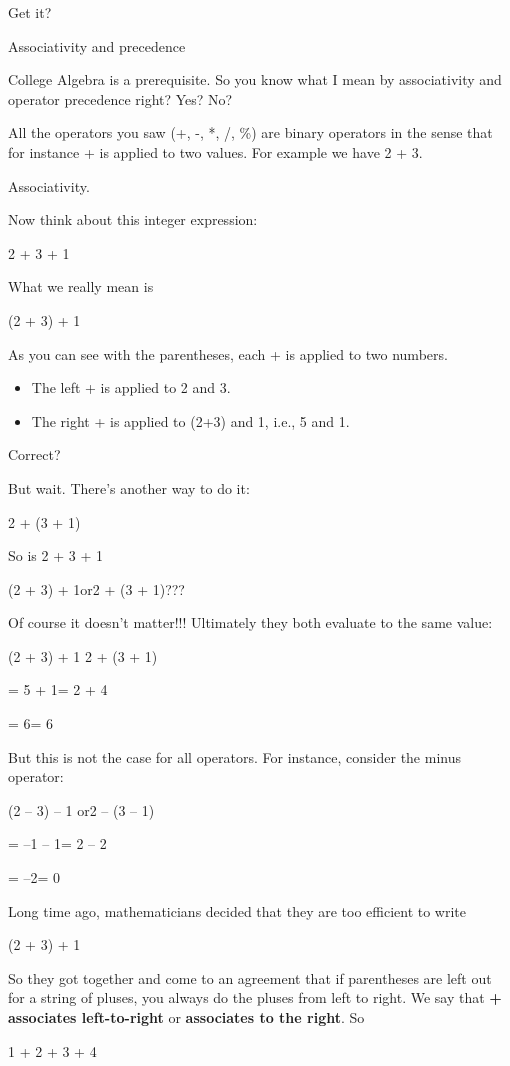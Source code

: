 \documentclass[
]{article}
\providecommand{\tightlist}{%
  \setlength{\itemsep}{0pt}\setlength{\parskip}{0pt}}
\begin{document}
Get it?

Associativity and precedence

College Algebra is a prerequisite. So you know what I mean by
associativity and operator precedence right? Yes? No?

All the operators you saw (+, -, *, /, \%) are binary operators in the
sense that for instance + is applied to two values. For example we have
2 + 3.

Associativity.

Now think about this integer expression:

2 + 3 + 1

What we really mean is

(2 + 3) + 1

As you can see with the parentheses, each + is applied to two numbers.

\begin{itemize}
\tightlist
\item
  The left + is applied to 2 and 3.
\item
  The right + is applied to (2+3) and 1, i.e., 5 and 1.
\end{itemize}

Correct?

But wait. There's another way to do it:

2 + (3 + 1)

So is 2 + 3 + 1

(2 + 3) + 1or2 + (3 + 1)???

Of course it doesn't matter!!! Ultimately they both evaluate to the same
value:

(2 + 3) + 1 2 + (3 + 1)

= 5 + 1= 2 + 4

= 6= 6

But this is not the case for all operators. For instance, consider the
minus operator:

(2 -- 3) -- 1 or2 -- (3 -- 1)

= --1 -- 1= 2 -- 2

= --2= 0

Long time ago, mathematicians decided that they are too efficient to
write

(2 + 3) + 1

So they got together and come to an agreement that if parentheses are
left out for a string of pluses, you always do the pluses from left to
right. We say that \textbf{+ associates left-to-right} or
\textbf{associates to the right}. So

1 + 2 + 3 + 4
\end{document}
